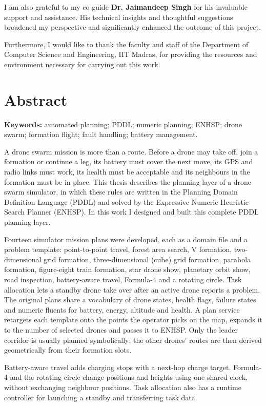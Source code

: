 \documentclass[11pt,a4paper,oneside]{report}
\newcommand{\coadvisor}{Dr. Jaimandeep Singh}
\newlength{\tocgap}\setlength{\tocgap}{1.0em}
\newcommand{\frontentry}[2]{\addvspace{\tocgap}\noindent\textbf{#1}\hfill\textbf{#2}\par}
\newcommand{\addfront}[1]{\addtocontents{toc}{\protect\frontentry{#1}{\thepage}}}
\begin{document}
I am also grateful to my co-guide \textbf{\coadvisor} for his invaluable support and assistance.
His technical insights and thoughtful suggestions broadened my perspective and significantly
enhanced the outcome of this project.

Furthermore, I would like to thank the faculty and staff of the Department of Computer Science
and Engineering, IIT Madras, for providing the resources and environment necessary for carrying
out this work.

\chapter*{Abstract}
\addfront{ABSTRACT}
\noindent\textbf{Keywords:} automated planning; PDDL; numeric planning; ENHSP; drone swarm;
formation flight; fault handling; battery management.

\medskip
A drone swarm mission is more than a route. Before a drone may take off, join a formation or
continue a leg, its battery must cover the next move, its GPS and radio links must work, its
health must be acceptable and its neighbours in the formation must be in place. This thesis
describes the planning layer of a drone swarm simulator, in which these rules are written in the
Planning Domain Definition Language (PDDL) and solved by the Expressive Numeric Heuristic Search
Planner (ENHSP). In this work I designed and built this complete PDDL planning layer.

Fourteen simulator mission plans were developed, each as a domain file and a problem template: point-to-point
travel, forest area search, V formation, two-dimensional grid formation, three-dimensional
(cube) grid formation, parabola formation, figure-eight train formation, star drone show,
planetary orbit show, road inspection, battery-aware travel, Formula-4 and a rotating circle.
Task allocation lets a standby drone take over after an active drone reports a problem.
The original plans share a vocabulary of drone states,
health flags, failure states and numeric fluents for battery, energy, altitude and health. A
plan service retargets each template onto the points the operator picks on the map, expands it
to the number of selected drones and passes it to ENHSP. Only the leader corridor is usually
planned symbolically; the other drones' routes are then derived geometrically from their
formation slots.

Battery-aware travel adds charging stops with a next-hop charge target. Formula-4 and the
rotating circle change positions and heights using one shared clock, without exchanging
neighbour positions. Task allocation also has a runtime controller for launching a standby and transferring task data.
\end{document}
